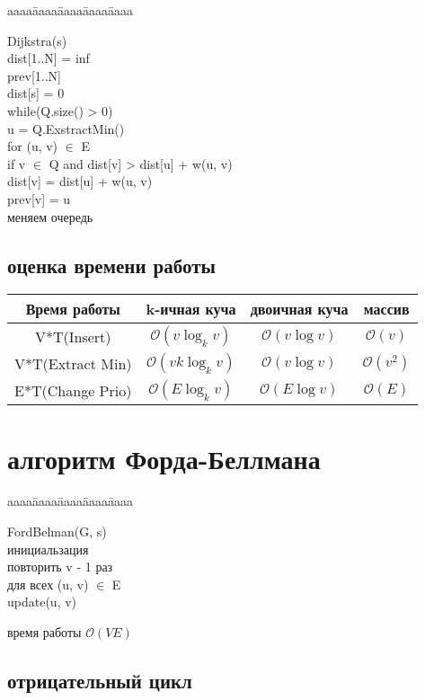 \documentclass[12pt]{article}
\def\t{\texttt}
\def\O{\mathcal{O}}
\newenvironment{MyTabbing}{
\t\bgroup
\begin{tabbing}
aaaa\=aaaa\=aaaa\=aaaa\=aaaa\kill
}{
\end{tabbing}
\t\egroup
}
\begin{document}
\begin{MyTabbing}
Dijkstra(s)\\
\>dist[1..N] = inf\\
\>prev[1..N]\\
\>dist[s] = 0\\
\>while(Q.size() > 0)\\
\>\>u = Q.ExstractMin()\\
\>\>for (u, v) $\in$ E\\
\>\>\>if v $\in$ Q and dist[v] > dist[u] + w(u, v)\\
\>\>\>\>dist[v] = dist[u] + w(u, v)\\
\>\>\>\>prev[v] = u\\
\>\>\>\>меняем очередь\\
\end{MyTabbing}

\subsection{оценка времени работы}

\begin{tabular}{|c|c|c|c|}
\hline
Время работы & k-ичная куча & двоичная куча & массив \\
\hline
V*T(Insert) & $\O(v\log_k v)$ & $\O(v\log v)$ & $\O(v)$  \\ 
\hline
V*T(Extract Min) & $\O(v k \log_k v)$ & $\O(v\log v)$ & $\O(v^2)$  \\ 
\hline
E*T(Change Prio) & $\O(E \log_k v)$ & $\O(E \log v)$ & $\O(E)$  \\ 
\hline

\end{tabular}

\section{алгоритм Форда-Беллмана}

\begin{MyTabbing}
FordBelman(G, s)\\
\>инициальзация\\
\>\>повторить v - 1 раз\\
\>\>\>для всех (u, v) $\in$ E\\
\>\>\>\>update(u, v)
\end{MyTabbing}

время работы $\O(VE)$

\subsection{отрицательный цикл}
\end{document}
